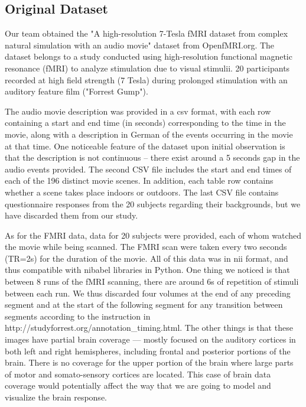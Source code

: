 \par \indent 

\subsection{Original Dataset}
\par Our team obtained the "A high-resolution 7-Tesla fMRI dataset from complex natural simulation with an audio movie" dataset from OpenfMRI.org. The dataset belongs to a study conducted using high-resolution functional magnetic resonance (fMRI) to analyze stimulation due to visual stimulii. 20 participants recorded at high field strength (7 Tesla) during prolonged stimulation with an auditory feature film ("Forrest Gump"). 

\par The audio movie description was provided in a csv format, with each row containing a start and end time (in seconds) corresponding to the time in the movie, along with a description in German of the events occurring in the movie at that time. One noticeable feature of the dataset upon initial observation is that the description
is not continuous -- there exist around a 5 seconds gap in the audio events provided. The second CSV file includes the start and end times of each of the 196 distinct movie scenes. In addition, each table row contains whether a scene takes place indoors or outdoors. The last CSV file contains questionnaire responses from the 20 subjects regarding their backgrounds,  but we have discarded them from our study. 

\par As for the FMRI data, data for 20 subjects were provided, each of whom watched the movie while being scanned. The FMRI scan were taken every two seconds (TR=2s) for the duration of the movie. All of this data was in nii format, and thus compatible with nibabel libraries in Python. One thing we noticed is that between 8 runs of the fMRI scanning, there are around 6s of repetition of stimuli between each run. We thus discarded four volumes at the end of any preceding segment and at the start of the following segment for any transition between segments according to the instruction in http://studyforrest.org/annotation\_timing.html. The other things is that these images have partial brain coverage — mostly focused on the auditory cortices in both left and right hemispheres, including frontal and posterior portions of the brain. There is no coverage for the upper portion of the brain where large parts of motor and somato-sensory cortices are located. This case of brain data coverage would potentially affect the way that we are going to model and visualize the brain response.

